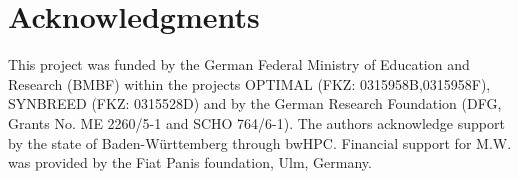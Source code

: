 \documentclass[12pt,titlepage]{article}
\begin{document}
\section{Acknowledgments} 
This project was funded by the German Federal Ministry of Education and 
Research (BMBF) within the projects OPTIMAL (FKZ: 0315958B,0315958F),
SYNBREED (FKZ: 0315528D) and by the German Research Foundation 
(DFG, Grants No. ME 2260/5-1 and SCHO 764/6-1).
The authors acknowledge support by the state of Baden-W{\"u}rttemberg through 
bwHPC.
Financial support for M.W. was provided by the Fiat Panis foundation, Ulm,
Germany.



\nolinenumbers


\end{document}
